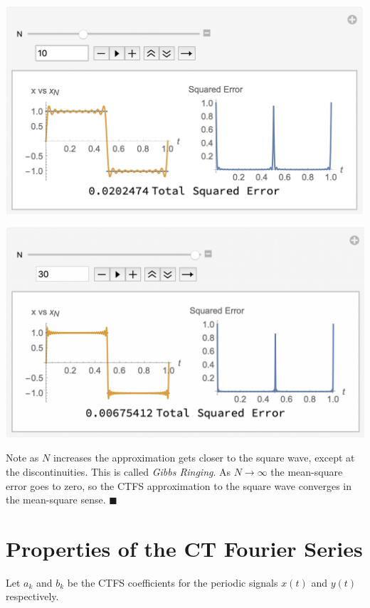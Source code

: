\begin{example}
  \begin{center}
    \includegraphics[scale=0.5]{graphics/squarewaveapprox2.png}
  \end{center}
  \begin{center}
    \includegraphics[scale=0.5]{graphics/squarewaveapprox3.png}
  \end{center}
  Note as $N$ increases the approximation gets closer to the square wave, except at the discontinuities. This is called \emph{Gibbs Ringing}. As $N \rightarrow \infty$ the mean-square error goes to zero, so the CTFS approximation to the square wave converges in the mean-square sense.
  $\blacksquare$
\end{example}


\section{Properties of the CT Fourier Series}

Let $a_k$ and $b_k$ be the CTFS coefficients for the periodic signals $x(t)$ and $y(t)$ respectively.

